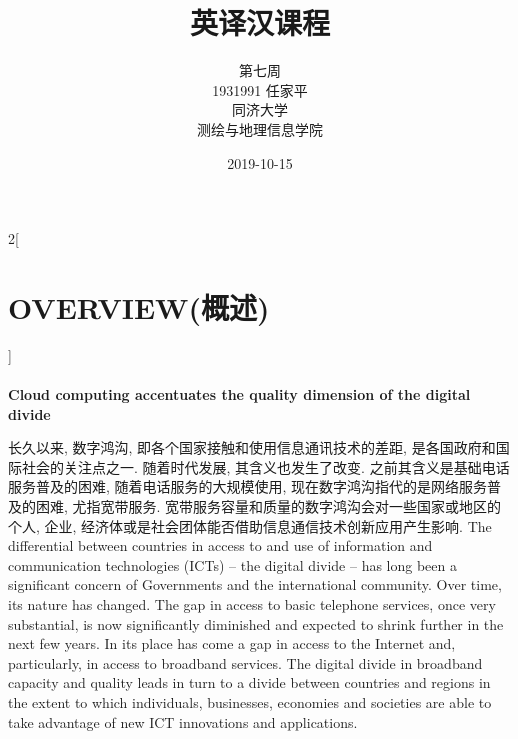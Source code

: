 \documentclass[a4paper, UTF8, 12pt]{article}
\begin{document}
\title{\Huge 英译汉课程}
\author{\Large 
        第七周 \\[12pt]
        1931991 任家平 \\[12pt]
        同济大学 \\[12pt]
        测绘与地理信息学院}
\date{2019-10-15}

\maketitle

\thispagestyle{empty}

\newpage
{}
\tableofcontents
{}

\newpage
{}

\begin{paracol}{2}[\section{OVERVIEW(概述)}]
    
    \switchcolumn*
    \paragraph{} 
    \switchcolumn
    {\bfseries Cloud computing accentuates the quality dimension of the digital divide}

    \switchcolumn*
    长久以来, 数字鸿沟, 即各个国家接触和使用信息通讯技术的差距, 是各国政府和国际社会的关注点之一. 随着时代发展, 其含义也发生了改变. 之前其含义是基础电话服务普及的困难, 随着电话服务的大规模使用, 现在数字鸿沟指代的是网络服务普及的困难, 尤指宽带服务. 宽带服务容量和质量的数字鸿沟会对一些国家或地区的个人, 企业, 经济体或是社会团体能否借助信息通信技术创新应用产生影响. 
    \switchcolumn
    The differential between countries in access to and use of information and communication technologies (ICTs) – the digital divide – has long been a significant concern of Governments and the international community. Over time, its nature has changed. The gap in access to basic telephone services, once very substantial, is now significantly diminished and expected to shrink further in the next few years. In its place has come a gap in access to the Internet and, particularly, in access to broadband services. The digital divide in broadband capacity and quality leads in turn to a divide between countries and regions in the extent to which individuals, businesses, economies and societies are able to take advantage of new ICT innovations and applications. 
    

\end{paracol}
\end{document}
